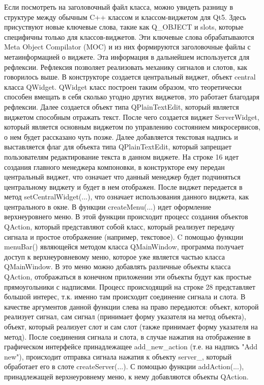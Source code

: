 \documentclass[a4paper, 14pt]{extreport}
\begin{document}
\par Если посмотреть на заголовочный файл класса, можно увидеть разницу в структуре между обычным C++ классом и классом-виджетом для 
Qt5. Здесь присуствуют новые ключевые слова, такие как Q\_OBJECT и slots, которые специфичны только для классов-виджетов. Эти ключевые 
слова обрабатываются Meta Object Compilator (MOC) и из них формируются заголовочные файлы с метаинформацией о виджете. Эта информация 
в дальнейшем используется для рефлексии. Рефлексия позволяет реализовать механику сигналов и слотов, как говорилось выше. В 
конструкторе создается центральный виджет, объект central класса QWidget. QWidget класс построен таким образом, что теоретически способен
вмещать в себя сколько угодно других виджетов, это работает благодаря рефлексии. Далее создается объект типа QPlainTextEdit, который 
является виджетом способным отражать текст. После чего создается виджет ServerWidget, который является основным виджетом по управлению 
состоянием микросервисов, о нем будет рассказано чуть позже. Далее добавляется текстовая надпись и выставляется флаг для объекта типа 
QPlainTextEdit, который запрещает пользователям редактирование текста в данном виджете. На строке 16 идет создания главного менеджера 
компоновки, в конструкторе ему передан центральный виджет, что означает что данный менеджер будет подчиняться центральному виджету и 
будет в нем отображен. После виджет передается в метод setCentralWidget(...), что означает использования данного виджета, как центрального 
в окне. В функции createMenu(...) идет оформление верхнеуровнего меню. В этой функции происходит процесс создания объектов QAction,
который представляют собой класс, который реализует передачу сигнала и простое отображение (например, текстовое). C помощью функции
menuBar() являющейся методом класса QMainWindow, программа получает доступ к верхнеуровневому меню, которое уже является частью 
класса QMainWindow. В это меню можно добавлять различные объекты класса QAction, отображаться в конечном приложении эти объекты будут
как простые прямоугольники с надписями. Процесс происходящий на строке 28 представляет большой интерес, т.к. именно там происходит 
соединение сигнала и слота. В качестве аргументов данной функции слева на право передаются: объект, которой реализует сигнал, сам 
сигнал (принимает форму указателя на метод объекта), объект, который реализует слот и сам слот (также принимает форму указателя на метод).
После соединения сигнала и слота, в случае нажатия на отображение в графическом интерфейсе принадлежащее add\_new\_action (т.е. на 
надпись "Add new"), происходит отправка сигнала нажатия к объекту server\_, который обработает его в слоте createServer(...). С помощью 
функции addAction(...), принадлежащей верхнеуровнему меню, к нему добавляются объекты QAction.
\end{document}
